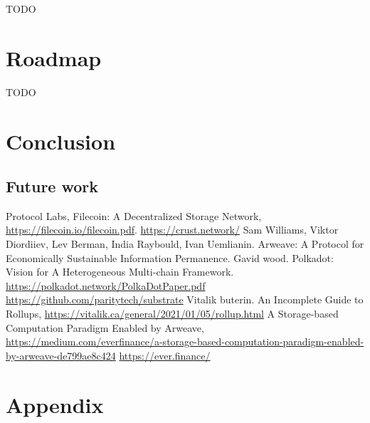 \documentclass[]{article}
\begin{document}
TODO

\section{Roadmap}

TODO

\section{Conclusion}

\subsection{Future work}

\begin{thebibliography}{99}
Protocol Labs, Filecoin: A Decentralized Storage Network, \url{https://filecoin.io/filecoin.pdf}.
\url{https://crust.network/}
Sam Williams, Viktor Diordiiev, Lev Berman, India Raybould, Ivan Uemlianin. Arweave: A Protocol for Economically Sustainable Information Permanence.
 Gavid wood. Polkadot: Vision for A Heterogeneous Multi-chain Framework. \url{https://polkadot.network/PolkaDotPaper.pdf}
\url{https://github.com/paritytech/substrate}
Vitalik buterin. An Incomplete Guide to Rollups, \url{https://vitalik.ca/general/2021/01/05/rollup.html}
A Storage-based Computation Paradigm Enabled by Arweave, \url{https://medium.com/everfinance/a-storage-based-computation-paradigm-enabled-by-arweave-de799ae8c424}
\url{https://ever.finance/}
\end{thebibliography}

\appendix
\section{Appendix}
\end{document}
